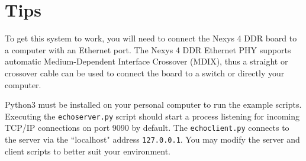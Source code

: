 \documentclass[11pt]{article}
\begin{document}
\section{Tips}

To get this system to work, you will need to connect the Nexys 4 DDR board to a computer with an Ethernet port.
The Nexys 4 DDR Ethernet PHY supports automatic Medium-Dependent Interface Crossover (MDIX), thus a straight or crossover cable can be used to connect the board to a switch or directly your computer.

Python3 must be installed on your personal computer to run the example scripts.
Executing the \verb|echoserver.py| script should start a process listening for incoming TCP/IP connections on port 9090 by default.
The \verb|echoclient.py| connects to the server via the ``localhost" address \verb|127.0.0.1|. 
You may modify the server and client scripts to better suit your environment.


\newpage
\printbibliography
\end{document}
